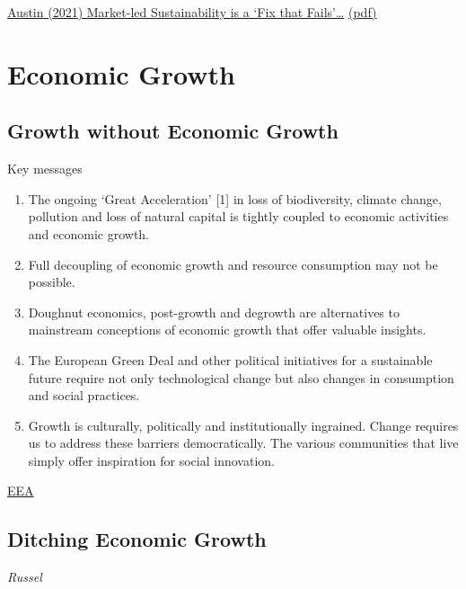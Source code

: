 \documentclass[
]{book}
\providecommand{\tightlist}{%
  \setlength{\itemsep}{0pt}\setlength{\parskip}{0pt}}
\begin{document}
\href{https://bothbrainsrequire\%20d.com/2021/10/25/fix-that-fails/}{Austin (2021) Market-led Sustainability is a `Fix that Fails'\ldots{}}
\href{pdf/Austin_2021_Market_Led_Sustainability_Fix_Fails.pdf}{(pdf)}

\hypertarget{economic-growth}{%
\chapter{Economic Growth}\label{economic-growth}}

\hypertarget{growth-without-economic-growth}{%
\section{Growth without Economic Growth}\label{growth-without-economic-growth}}

Key messages

\begin{enumerate}
\def\labelenumi{\arabic{enumi}.}
\tightlist
\item
  The ongoing `Great Acceleration' {[}1{]} in loss of biodiversity, climate change, pollution and loss of natural capital is tightly coupled to economic activities and economic growth.
\item
  Full decoupling of economic growth and resource consumption may not be possible.
\item
  Doughnut economics, post-growth and degrowth are alternatives to mainstream conceptions of economic growth that offer valuable insights.
\item
  The European Green Deal and other political initiatives for a sustainable future require not only technological change but also changes in consumption and social practices.
\item
  Growth is culturally, politically and institutionally ingrained. Change requires us to address these barriers democratically. The various communities that live simply offer inspiration for social innovation.
\end{enumerate}

\href{https://www.eea.europa.eu/publications/growth-without-economic-growth}{EEA}

\hypertarget{ditching-economic-growth}{%
\section{Ditching Economic Growth}\label{ditching-economic-growth}}

\emph{Russel}
\end{document}
